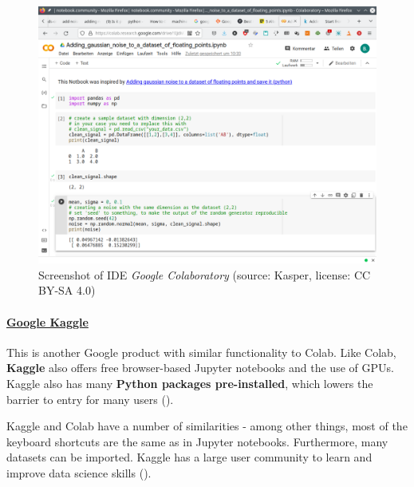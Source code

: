 \documentclass [oneside,10pt,a4paper,ngerman,BCOR10mm,headsepline,parindent,final]{scrartcl}
\begin{document}
\begin{figure}
\centering
\includegraphics{images/Screenshot_google_Colab.png}
\caption{Screenshot of IDE \emph{Google Colaboratory} (source: Kasper,
license: CC BY-SA 4.0)}
\end{figure}

    \hypertarget{google-kaggle}{%
\paragraph{\texorpdfstring{\href{https://www.kaggle.com}{Google
Kaggle}}{Google Kaggle}}\label{google-kaggle}}

This is another Google product with similar functionality to Colab. Like
Colab, \textbf{Kaggle} also offers free browser-based Jupyter notebooks
and the use of GPUs. Kaggle also has many \textbf{Python packages
pre-installed}, which lowers the barrier to entry for many users
(\cite{Colab_Alternatives_2021}).

Kaggle and Colab have a number of similarities - among other things,
most of the keyboard shortcuts are the same as in Jupyter notebooks.
Furthermore, many datasets can be imported. Kaggle has a large user
community to learn and improve data science skills
(\cite{Colab_5_Alternatives_2021}).
\end{document}
